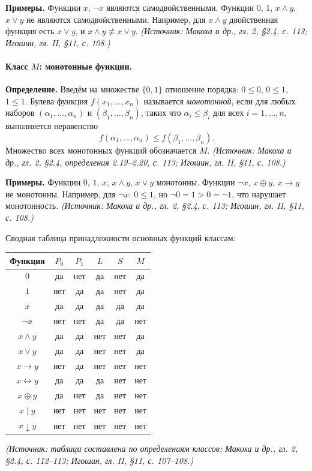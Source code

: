 \documentclass[a4paper,12pt]{article}
\begin{document}
\textbf{Примеры.} Функции \(x\), \(\neg x\) являются самодвойственными. Функции \(0\), \(1\), \(x\land y\), \(x\lor y\) не являются самодвойственными. Например, для \(x\land y\) двойственная функция есть \(x\lor y\), и \(x\land y\not\equiv x\lor y\).
\textit{(Источник: Макоха и др., гл. 2, §2.4, с. 113; Игошин, гл. II, §11, с. 108.)}

\paragraph{Класс \(M\): монотонные функции.}
\textbf{Определение.} Введём на множестве \(\{0,1\}\) отношение порядка: \(0\le 0\), \(0\le 1\), \(1\le 1\). Булева функция \(f(x_1,\ldots,x_n)\) называется \emph{монотонной}, если для любых наборов \((\alpha_1,\ldots,\alpha_n)\) и \((\beta_1,\ldots,\beta_n)\), таких что \(\alpha_i\le\beta_i\) для всех \(i=1,\ldots,n\), выполняется неравенство
\[
f(\alpha_1,\ldots,\alpha_n)\le f(\beta_1,\ldots,\beta_n).
\]
Множество всех монотонных функций обозначается \(M\).
\textit{(Источник: Макоха и др., гл. 2, §2.4, определения 2.19--2.20, с. 113; Игошин, гл. II, §11, с. 108.)}

\textbf{Примеры.} Функции \(0\), \(1\), \(x\), \(x\land y\), \(x\lor y\) монотонны. Функции \(\neg x\), \(x\oplus y\), \(x\to y\) не монотонны. Например, для \(\neg x\): \(0\le 1\), но \(\neg 0=1>0=\neg 1\), что нарушает монотонность.
\textit{(Источник: Макоха и др., гл. 2, §2.4, с. 113; Игошин, гл. II, §11, с. 108.)}

Сводная таблица принадлежности основных функций классам:
\begin{center}
\begin{tabular}{c|ccccc}
\toprule
Функция & \(P_0\) & \(P_1\) & \(L\) & \(S\) & \(M\)\\
\midrule
\(0\) & да & нет & да & нет & да\\
\(1\) & нет & да & да & нет & да\\
\(x\) & да & да & да & да & да\\
\(\neg x\) & нет & нет & да & да & нет\\
\(x\land y\) & да & да & нет & нет & да\\
\(x\lor y\) & да & да & нет & нет & да\\
\(x\to y\) & нет & да & нет & нет & нет\\
\(x\leftrightarrow y\) & да & да & да & нет & нет\\
\(x\oplus y\) & да & нет & да & нет & нет\\
\(x\mid y\) & нет & нет & нет & нет & нет\\
\(x\downarrow y\) & нет & нет & нет & нет & нет\\
\bottomrule
\end{tabular}
\end{center}
\textit{(Источник: таблица составлена по определениям классов: Макоха и др., гл. 2, §2.4, с. 112--113; Игошин, гл. II, §11, с. 107--108.)}
\end{document}
